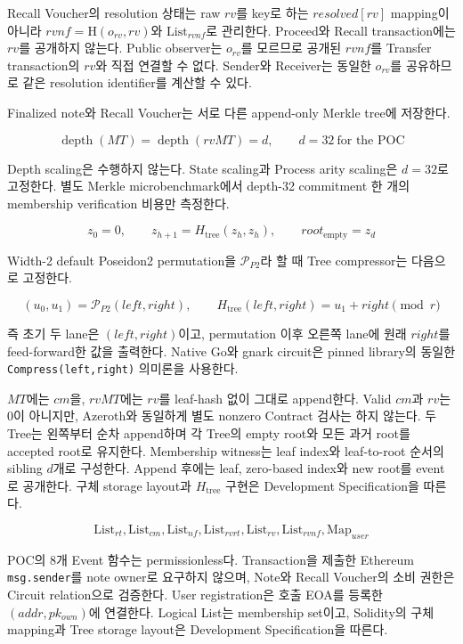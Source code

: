 \documentclass[11pt,a4paper]{extarticle}
\newcommand{\Hash}{\mathrm{H}}
\newcommand{\List}[1]{\mathrm{List}_{#1}}
\newcommand{\Map}[1]{\mathrm{Map}_{#1}}
\begin{document}
Recall Voucher의 resolution 상태는 raw $rv$를 key로 하는 $resolved[rv]$ mapping이 아니라
$rvnf=\Hash(o_{rv},rv)$와 $\List{rvnf}$로 관리한다. Proceed와 Recall transaction에는
$rv$를 공개하지 않는다. Public observer는 $o_{rv}$를 모르므로 공개된 $rvnf$를
Transfer transaction의 $rv$와 직접 연결할 수 없다. Sender와 Receiver는 동일한
$o_{rv}$를 공유하므로 같은 resolution identifier를 계산할 수 있다.

Finalized note와 Recall Voucher는 서로 다른 append-only Merkle tree에 저장한다.

\[
\operatorname{depth}(MT)=\operatorname{depth}(rvMT)=d,
\qquad
d=32\ \text{for the POC}
\]

Depth scaling은 수행하지 않는다. State scaling과 Process arity scaling은
$d=32$로 고정한다. 별도 Merkle microbenchmark에서 depth-32 commitment 한 개의
membership verification 비용만 측정한다.

\[
z_0=0,
\qquad
z_{h+1}=H_{\mathrm{tree}}(z_h,z_h),
\qquad
root_{\mathrm{empty}}=z_d
\]

Width-2 default Poseidon2 permutation을 $\mathcal{P}_{P2}$라 할 때 Tree compressor는
다음으로 고정한다.

\[
(u_0,u_1)=\mathcal{P}_{P2}(left,right),
\qquad
H_{\mathrm{tree}}(left,right)=u_1+right\pmod r
\]

즉 초기 두 lane은 $(left,right)$이고, permutation 이후 오른쪽 lane에 원래
$right$를 feed-forward한 값을 출력한다. Native Go와 gnark circuit은 pinned library의
동일한 \texttt{Compress(left,right)} 의미론을 사용한다.

$MT$에는 $cm$을, $rvMT$에는 $rv$를 leaf-hash 없이 그대로 append한다. Valid $cm$과
$rv$는 0이 아니지만, Azeroth와 동일하게 별도 nonzero Contract 검사는 하지 않는다.
두 Tree는 왼쪽부터 순차 append하며 각 Tree의 empty root와 모든 과거 root를 accepted
root로 유지한다. Membership witness는 leaf index와 leaf-to-root 순서의 sibling
$d$개로 구성한다. Append 후에는 leaf, zero-based index와 new root를 event로
공개한다. 구체 storage layout과 $H_{\mathrm{tree}}$ 구현은 Development
Specification을 따른다.

\[
  \List{rt},\List{cm},\List{nf},
  \List{rvrt},\List{rv},\List{rvnf},
  \Map{user}
\]

POC의 8개 Event 함수는 permissionless다. Transaction을 제출한 Ethereum
\texttt{msg.sender}를 note owner로 요구하지 않으며, Note와 Recall
Voucher의 소비 권한은 Circuit relation으로 검증한다. User registration은 호출 EOA를
등록한 $(addr,pk_{own})$에 연결한다. Logical List는
membership set이고, Solidity의 구체 mapping과 Tree storage layout은 Development
Specification을 따른다.
\end{document}
